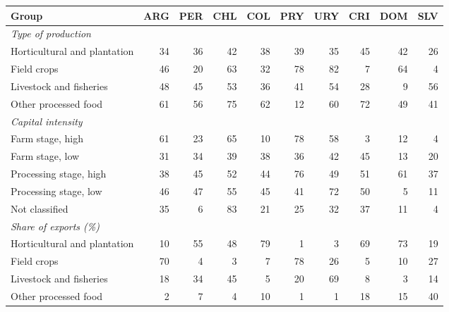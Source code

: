 \begin{tabular}{lrrrrrrrrr}
\toprule
Group & ARG & PER & CHL & COL & PRY & URY & CRI & DOM & SLV \\
\midrule
\textit{Type of production} &  &  &  &  &  &  &  &  &  \\
Horticultural and plantation & 34 & 36 & 42 & 38 & 39 & 35 & 45 & 42 & 26 \\
Field crops & 46 & 20 & 63 & 32 & 78 & 82 & 7 & 64 & 4 \\
Livestock and fisheries & 48 & 45 & 53 & 36 & 41 & 54 & 28 & 9 & 56 \\
Other processed food & 61 & 56 & 75 & 62 & 12 & 60 & 72 & 49 & 41 \\
\textit{Capital intensity} &  &  &  &  &  &  &  &  &  \\
Farm stage, high & 61 & 23 & 65 & 10 & 78 & 58 & 3 & 12 & 4 \\
Farm stage, low & 31 & 34 & 39 & 38 & 36 & 42 & 45 & 13 & 20 \\
Processing stage, high & 38 & 45 & 52 & 44 & 76 & 49 & 51 & 61 & 37 \\
Processing stage, low & 46 & 47 & 55 & 45 & 41 & 72 & 50 & 5 & 11 \\
Not classified & 35 & 6 & 83 & 21 & 25 & 32 & 37 & 11 & 4 \\
\textit{Share of exports (\%)} &  &  &  &  &  &  &  &  &  \\
Horticultural and plantation & 10 & 55 & 48 & 79 & 1 & 3 & 69 & 73 & 19 \\
Field crops & 70 & 4 & 3 & 7 & 78 & 26 & 5 & 10 & 27 \\
Livestock and fisheries & 18 & 34 & 45 & 5 & 20 & 69 & 8 & 3 & 14 \\
Other processed food & 2 & 7 & 4 & 10 & 1 & 1 & 18 & 15 & 40 \\
\bottomrule
\end{tabular}
